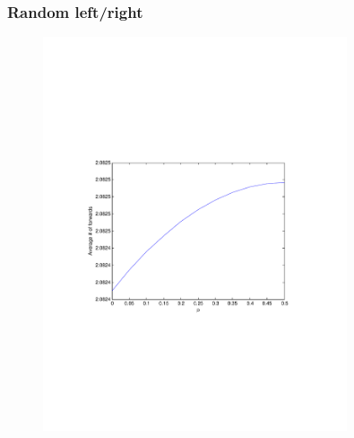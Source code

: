 \documentclass[compress]{beamer}
\begin{document}
\begin{frame}
\frametitle{Random left/right}
\begin{figure}[h!tb]
\centering
\includegraphics[clip=true, trim=8em 21em 9em 22em, width=0.8\textwidth]{../resources/plotrandlrp.pdf}
\end{figure}
\end{frame}
\end{document}
